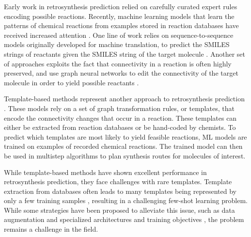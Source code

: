 Early work in retrosynthesis prediction relied on carefully curated expert rules encoding possible
reactions. Recently, machine learning models that learn the patterns of chemical reactions from
examples stored in reaction databases have received increased attention
\citep{coleyMachineLearningComputerAided2018,strieth-kalthoffMachineLearningRopes2020,seglerNeuralSymbolicMachineLearning2017,seglerPlanningChemicalSyntheses2018}. One line of
work relies on sequence-to-sequence models originally developed for machine translation, to predict
the SMILES strings of reactants given the SMILES string of the target molecule
\citep{schwallerMolecularTransformerModel2019,namLinkingNeuralMachine2016,schwallerFoundTranslationPredicting2018,karpovTransformerModelRetrosynthesis2019,tetkoStateartAugmentedNLP2020}.
Another set of approaches exploits the fact that connectivity in a reaction is often highly
preserved, and use graph neural networks to edit the connectivity of the target molecule in order to
yield possible reactants
\citep{sachaMoleculeEditGraph2021,shiGraphGraphsFramework2020,somnathLearningGraphModels2021,yanRetroXpertDecomposeRetrosynthesis2020}.

Template-based methods represent another approach to retrosynthesis prediction
\citep{seglerNeuralSymbolicMachineLearning2017,seglerPlanningChemicalSyntheses2018,daiRetrosynthesisPredictionConditional2019,sunUnderstandingRetrosynthesisEnergybased2021}.
These models rely on a set of graph transformation rules, or templates, that encode the connectivity
changes that occur in a reaction. These templates can either be extracted from reaction databases or
be hand-coded by chemists. To predict which templates are most likely to yield feasible reactions,
\ac{ML} models are trained on examples of recorded chemical reactions. The trained model can then be
used in multistep algorithms to plan synthesis routes for molecules of interest.

While template-based methods have shown excellent performance in retrosynthesis prediction, they
face challenges with rare templates. Template extraction from databases often leads to many
templates being represented by only a few training samples
\citep{fortunatoDataAugmentationPretraining2020}, resulting in a challenging few-shot learning
problem. While some strategies have been proposed to alleviate this issue, such as data augmentation
\citep{fortunatoDataAugmentationPretraining2020} and specialized architectures and training
objectives \citep{daiRetrosynthesisPredictionConditional2019}, the problem remains a challenge in
the field.

